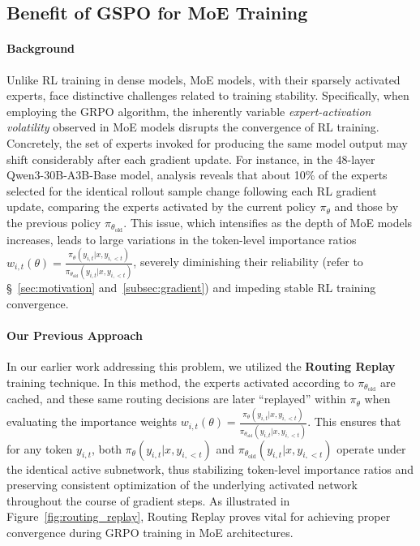 \subsection{Benefit of GSPO for MoE Training}
\label{subsec:routing_replay}

\paragraph{Background}
Unlike RL training in dense models, MoE models, with their sparsely activated experts, face distinctive challenges related to training stability. Specifically, when employing the GRPO algorithm, the inherently variable \textit{expert-activation volatility} observed in MoE models disrupts the convergence of RL training. Concretely, the set of experts invoked for producing the same model output may shift considerably after each gradient update. For instance, in the 48-layer Qwen3-30B-A3B-Base model, analysis reveals that about 10\% of the experts selected for the identical rollout sample change following each RL gradient update, comparing the experts activated by the current policy $\pi_{\theta}$ and those by the previous policy $\pi_{\theta_\text{old}}$.
This issue, which intensifies as the depth of MoE models increases, leads to large variations in the token-level importance ratios $w_{i,t}(\theta) = \frac{ \pi_{\theta} (y_{i,t} | x, y_{i,<t}) }{ \pi_{\theta_\text{old}} (y_{i,t} | x,y_{i,<t})}$, severely diminishing their reliability (refer to \S~\ref{sec:motivation} and~\ref{subsec:gradient}) and impeding stable RL training convergence.

\paragraph{Our Previous Approach} In our earlier work addressing this problem, we utilized the \textbf{Routing Replay} training technique. In this method, the experts activated according to $\pi_{\theta_\text{old}}$ are cached, and these same routing decisions are later ``replayed'' within $\pi_{\theta}$ when evaluating the importance weights $w_{i,t}(\theta) = \frac{ \pi_{\theta} (y_{i,t} | x, y_{i,<t}) }{ \pi_{\theta_\text{old}} (y_{i,t} | x,y_{i,<t})}$. This ensures that for any token $y_{i,t}$, both $\pi_{\theta} (y_{i,t} | x, y_{i,<t})$ and $\pi_{\theta_\text{old}} (y_{i,t} | x,y_{i,<t})$ operate under the identical active subnetwork, thus stabilizing token-level importance ratios and preserving consistent optimization of the underlying activated network throughout the course of gradient steps. As illustrated in Figure~\ref{fig:routing_replay}, Routing Replay proves vital for achieving proper convergence during GRPO training in MoE architectures.

